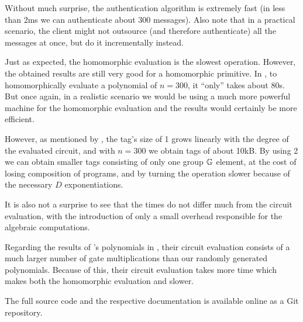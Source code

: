 



Without much surprise, the authentication algorithm \Auth is extremely fast (in
less than 2ms we can authenticate about 300 messages). Also note that in
a practical scenario, the client might not outsource (and therefore
authenticate) all the messages at once, but do it incrementally instead.

Just as expected, the homomorphic evaluation \Eval is the slowest operation.
However, the obtained results are still very good for a homomorphic primitive.
In , to homomorphically evaluate a polynomial of $n
= 300$, it ``only'' takes about 80s. But once again, in a realistic scenario we
would be using a much more powerful machine for the homomorphic evaluation and
the results would certainly be more efficient.

However, as mentioned by \citeauthor{catalano:fiore:2013}, the tag's size of
1 grows linearly with the degree of the
evaluated circuit, and with $n = 300$ we obtain tags of about 10kB.
By using 2 we can obtain smaller 
tags consisting of only one group $\mathbb{G}$ element, at the cost of losing
composition of programs, and by turning the \KeyGen operation slower because of
the necessary $D$ exponentiations.

It is also not a surprise to see that the \Vrfy times do not differ much from
the circuit evaluation, with the introduction of only a small overhead
responsible for the algebraic computations.

Regarding the results of 's
polynomials in , their circuit evaluation
consists of a much larger number of gate multiplications than our randomly
generated polynomials. Because of this, their circuit evaluation takes more
time which makes both the homomorphic evaluation \Eval and \Vrfy
slower.

The full source code and the respective documentation is available online as
a Git repository\footnotemark.
